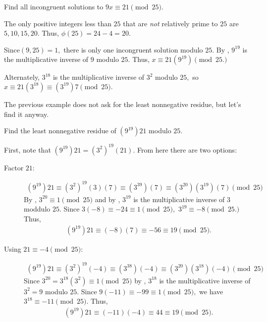 \documentclass{ximera}
\begin{document}
\begin{example}
  Find all incongruent solutions to $9x\equiv 21\pmod{25}$.
  
  The only positive integers less than $25$ that are \emph{not} relatively prime to $25$ are $5,10,15,20$. Thus, $\phi(25)=24-4=20.$

  Since$(9,25)=1,$ there is only one  incongruent solution  modulo $25.$ By , $9^{19}$ is the multiplicative inverse of $9$ modulo ${25}$. Thus, $x\equiv 21(9^{19})\pmod{25.}$

  Alternately, $3^{18}$ is the multiplicative inverse of $3^2$ modulo ${25},$ so $x\equiv 21(3^{18})\equiv  (3^{19})7\pmod{25}.$
\end{example}

The previous example does not ask for the least nonnegative residue, but let's find it anyway.

\begin{example}
  Find the least nonnegative residue of $(9^{19})21$ modulo $25$.

  First, note that $(9^{19})21=(3^2)^19(21)$. From here there are two options:

  \begin{description}
    \item[Factor $21$:]
      \begin{align*}
        (9^{19})21\equiv (3^2)^19(3)(7)
        \equiv (3^{39})(7)
        \equiv (3^{20})(3^{19})(7) \pmod{25}
      \end{align*}
      By , $3^{20}\equiv 1\pmod{25}$ and by , $3^{19}$ is the multiplicative inverse of $3$ moddulo $25.$ Since $3(-8)\equiv -24\equiv 1\pmod{25},$ $3^{19}\equiv -8\pmod{25.}$ Thus, 
      \begin{align*}
        (9^{19})21\equiv (-8)(7)\equiv -56\equiv 19 \pmod{25}.
      \end{align*}

    \item[Using $21\equiv -4\pmod{25}$:] 
      \begin{align*}
        (9^{19})21\equiv (3^2)^19(-4)
        \equiv (3^{38})(-4)
        \equiv (3^{20})(3^{18})(-4) \pmod{25}
      \end{align*}
      Since $3^{20}=3^{18}(3^2)\equiv 1\pmod{25}$ by , $3^{18}$ is the multiplicative inverse of $3^2=9$ modulo $25.$ Since $9(-11)\equiv -99\equiv 1\pmod{25},$ we have $3^{18}\equiv -11\pmod{25}.$ Thus, 
      \begin{align*}
        (9^{19})21\equiv (-11)(-4)\equiv 44 \equiv 19 \pmod{25}.
      \end{align*}
  \end{description}
  
\end{example}
\end{document}
